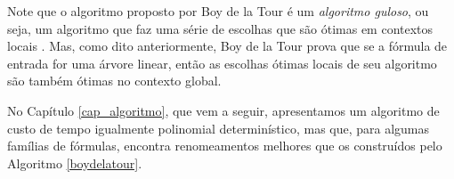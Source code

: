 Note que o algoritmo proposto por Boy de la Tour é um \emph{algoritmo guloso}, ou seja, um algoritmo que faz uma série de escolhas que são ótimas em contextos locais \cite{CLRS09}. Mas, como dito anteriormente, Boy de la Tour prova que se a fórmula de entrada for uma árvore linear, então as escolhas ótimas locais de seu algoritmo são também ótimas no contexto global.

No Capítulo \ref{cap_algoritmo}, que vem a seguir, apresentamos um algoritmo de custo de tempo igualmente polinomial determinístico, mas que, para algumas famílias de fórmulas, encontra renomeamentos melhores que os construídos pelo Algoritmo \ref{boydelatour}.
